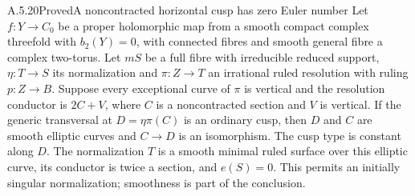 \begin{statement}{A.5.20}{Proved}{A noncontracted horizontal cusp has zero Euler number}
Let $f:Y\to C_0$ be a proper holomorphic map from a smooth
compact complex threefold with $b_2(Y)=0$, with connected
fibres and smooth general fibre a complex two-torus.
Let $mS$ be a full fibre with irreducible reduced support,
$\eta:T\to S$ its normalization and $\pi:Z\to T$ an
irrational ruled resolution with ruling $p:Z\to B$.
Suppose every exceptional curve of $\pi$ is vertical
and the resolution conductor is $2C+V$, where $C$
is a noncontracted section and $V$ is vertical.
If the generic transversal at $D=\eta\pi(C)$ is an
ordinary cusp, then $D$ and $C$ are smooth elliptic
curves and $C\to D$ is an isomorphism. The cusp type
is constant along $D$. The normalization $T$ is a
smooth minimal ruled surface over this elliptic curve,
its conductor is twice a section, and $e(S)=0$.
This permits an initially singular normalization;
smoothness is part of the conclusion.
\end{statement}

